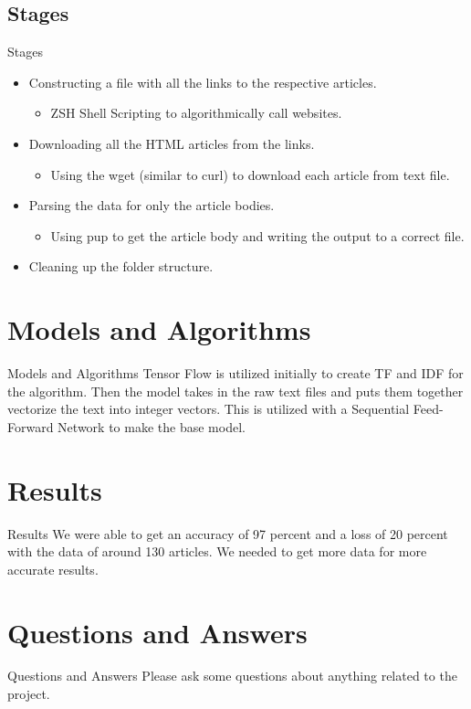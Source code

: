 \documentclass{beamer}
\begin{document}
\subsection{Stages}
\begin{frame}{Stages}
	\begin{itemize}
		\item<1-> Constructing a file with all the links to the respective articles.
			\begin{itemize}
				\item ZSH Shell Scripting to algorithmically call websites.
			\end{itemize}
		\item<2-> Downloading all the HTML articles from the links.
			\begin{itemize}
				\item Using the wget (similar to curl) to download each article from text file.
			\end{itemize}
		\item<3-> Parsing the data for only the article bodies.
			\begin{itemize}
				\item Using pup to get the article body and writing the output to a correct file.
			\end{itemize}
		\item<4-> Cleaning up the folder structure.
	\end{itemize}
\end{frame}

\section{Models and Algorithms}
\begin{frame}{Models and Algorithms}
	Tensor Flow is utilized initially to create TF and IDF for the algorithm.
	Then the model takes in the raw text files and puts them together vectorize the text into integer vectors.
	This is utilized with a Sequential Feed-Forward Network to make the base model.
\end{frame}
\section{Results}

\begin{frame}{Results}
	We were able to get an accuracy of 97 percent and a loss of 20 percent with the data of around 130 articles.
	We needed to get more data for more accurate results.
\end{frame}

\section{Questions and Answers}
\begin{frame}{Questions and Answers}
	Please ask some questions about anything related to the project.
\end{frame}
\end{document}

